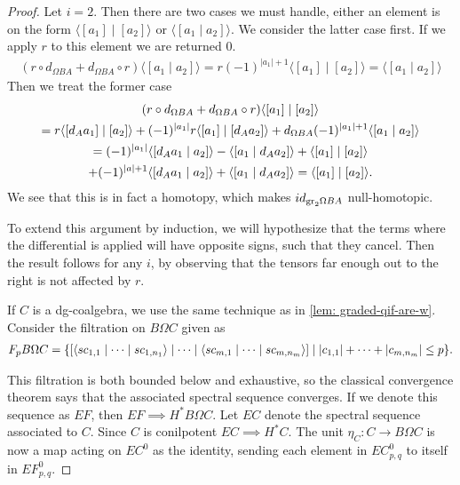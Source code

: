 \documentclass[../thesis.tex]{subfiles}
\begin{document}
\begin{proof}
                Let $i=2$. Then there are two cases we must handle, either an element is on the form $\langle [a_1] \mid [a_2] \rangle$ or $\langle [a_1 \mid a_2] \rangle$. We consider the latter case first. If we apply $r$ to this element we are returned $0$. 
                \begin{align*}
                    (r\circ d_{\Omega BA}+d_{\Omega BA}\circ r)\langle [a_1 \mid a_2] \rangle = r (-1)^{|a_1|+1}\langle [a_1] \mid [a_2] \rangle = \langle [a_1 \mid a_2] \rangle
                \end{align*}
                Then we treat the former case
                \begin{multline*}
                    (r\circ d_{\Omega BA}+d_{\Omega BA}\circ r)\langle [a_1] \mid [a_2] \rangle \\ 
                    = r\langle [d_Aa_1] \mid [a_2] \rangle + (-1)^{|a_1|}r\langle [a_1] \mid [d_Aa_2] \rangle + d_{\Omega BA}(-1)^{|a_1|+1}\langle [a_1 \mid a_2]\rangle \\
                    = (-1)^{|a_1|}\langle [ d_Aa_1 \mid a_2] \rangle - \langle [a_1 \mid d_Aa_2] \rangle + \langle [a_1] \mid [a_2] \rangle \\
                    + (-1)^{|a|+1}\langle [d_Aa_1 \mid a_2] \rangle  + \langle [a_1 \mid d_Aa_2] \rangle = \langle [a_1] \mid [a_2] \rangle\tt{.}
                \end{multline*}
                We see that this is in fact a homotopy, which makes $id_{\tt{gr}_2 \Omega BA}$ null-homotopic.

                To extend this argument by induction, we will hypothesize that the terms where the differential is applied will have opposite signs, such that they cancel. Then the result follows for any $i$, by observing that the tensors far enough out to the right is not affected by $r$.

                If $C$ is a dg-coalgebra, we use the same technique as in \ref{lem: graded-qif-are-w}. Consider the filtration on $B\Omega C$ given as
                \begin{align*}
                    F_pB\Omega C = \startset{[\langle sc_{1,1}\mid \cdots \mid sc_{1,n_1}\rangle \mid \cdots \mid \langle sc_{m, 1}\mid \cdots \mid sc_{m,n_m} \rangle] \mid |c_{1,1}| + \cdots + |c_{m,n_m}|\leq p}\text{.}
                \end{align*}
                
                This filtration is both bounded below and exhaustive, so the classical convergence theorem says that the associated spectral sequence converges. If we denote this sequence as $EF$, then $EF \implies H^*B\Omega C$. Let $EC$ denote the spectral sequence associated to $C$. Since $C$ is conilpotent $EC \implies H^*C$. The unit $\eta_C : C \rightarrow B\Omega C$ is now a map acting on $EC^0$ as the identity, sending each element in $EC^0_{p,q}$ to itself in $EF^0_{p,q}$.
                

\end{proof}
\end{document}
